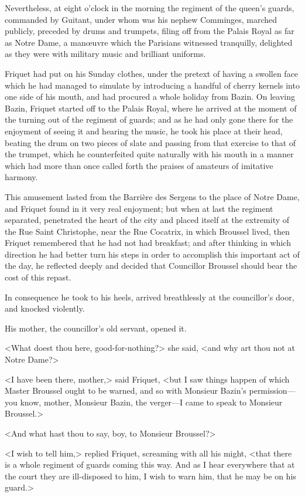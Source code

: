 Nevertheless, at eight o'clock in the morning the regiment of the queen's guards, commanded by Guitant, under whom was his nephew Comminges, marched publicly, preceded by drums and trumpets, filing off from the Palais Royal as far as Notre Dame, a manœuvre which the Parisians witnessed tranquilly, delighted as they were with military music and brilliant uniforms.

Friquet had put on his Sunday clothes, under the pretext of having a swollen face which he had managed to simulate by introducing a handful of cherry kernels into one side of his mouth, and had procured a whole holiday from Bazin. On leaving Bazin, Friquet started off to the Palais Royal, where he arrived at the moment of the turning out of the regiment of guards; and as he had only gone there for the enjoyment of seeing it and hearing the music, he took his place at their head, beating the drum on two pieces of slate and passing from that exercise to that of the trumpet, which he counterfeited quite naturally with his mouth in a manner which had more than once called forth the praises of amateurs of imitative harmony.

This amusement lasted from the Barrière des Sergens to the place of Notre Dame, and Friquet found in it very real enjoyment; but when at last the regiment separated, penetrated the heart of the city and placed itself at the extremity of the Rue Saint Christophe, near the Rue Cocatrix, in which Broussel lived, then Friquet remembered that he had not had breakfast; and after thinking in which direction he had better turn his steps in order to accomplish this important act of the day, he reflected deeply and decided that Councillor Broussel should bear the cost of this repast.

In consequence he took to his heels, arrived breathlessly at the councillor's door, and knocked violently.

His mother, the councillor's old servant, opened it.

<What doest thou here, good-for-nothing?> she said, <and why art thou not at Notre Dame?>

<I have been there, mother,> said Friquet, <but I saw things happen of which Master Broussel ought to be warned, and so with Monsieur Bazin's permission—you know, mother, Monsieur Bazin, the verger—I came to speak to Monsieur Broussel.>

<And what hast thou to say, boy, to Monsieur Broussel?>

<I wish to tell him,> replied Friquet, screaming with all his might, <that there is a whole regiment of guards coming this way. And as I hear everywhere that at the court they are ill-disposed to him, I wish to warn him, that he may be on his guard.>

